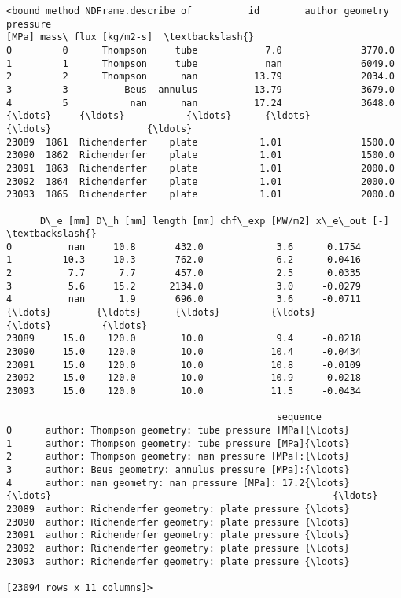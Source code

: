 \documentclass[11pt]{article}
\makeatletter
\newcommand{\boxspacing}{\kern\kvtcb@left@rule\kern\kvtcb@boxsep}
\newcommand{\prompt}[4]{
        {\ttfamily\llap{{\color{#2}[#3]:\hspace{3pt}#4}}\vspace{-\baselineskip}}
    }
\makeatother
\begin{document}
            \begin{tcolorbox}[breakable, size=fbox, boxrule=.5pt, pad at break*=1mm, opacityfill=0]
\prompt{Out}{outcolor}{2}{\boxspacing}
\begin{Verbatim}[commandchars=\\\{\}]
<bound method NDFrame.describe of          id        author geometry pressure
[MPa] mass\_flux [kg/m2-s]  \textbackslash{}
0         0      Thompson     tube            7.0              3770.0
1         1      Thompson     tube            nan              6049.0
2         2      Thompson      nan          13.79              2034.0
3         3          Beus  annulus          13.79              3679.0
4         5           nan      nan          17.24              3648.0
{\ldots}     {\ldots}           {\ldots}      {\ldots}            {\ldots}                 {\ldots}
23089  1861  Richenderfer    plate           1.01              1500.0
23090  1862  Richenderfer    plate           1.01              1500.0
23091  1863  Richenderfer    plate           1.01              2000.0
23092  1864  Richenderfer    plate           1.01              2000.0
23093  1865  Richenderfer    plate           1.01              2000.0

      D\_e [mm] D\_h [mm] length [mm] chf\_exp [MW/m2] x\_e\_out [-]  \textbackslash{}
0          nan     10.8       432.0             3.6      0.1754
1         10.3     10.3       762.0             6.2     -0.0416
2          7.7      7.7       457.0             2.5      0.0335
3          5.6     15.2      2134.0             3.0     -0.0279
4          nan      1.9       696.0             3.6     -0.0711
{\ldots}        {\ldots}      {\ldots}         {\ldots}             {\ldots}         {\ldots}
23089     15.0    120.0        10.0             9.4     -0.0218
23090     15.0    120.0        10.0            10.4     -0.0434
23091     15.0    120.0        10.0            10.8     -0.0109
23092     15.0    120.0        10.0            10.9     -0.0218
23093     15.0    120.0        10.0            11.5     -0.0434

                                                sequence
0      author: Thompson geometry: tube pressure [MPa]{\ldots}
1      author: Thompson geometry: tube pressure [MPa]{\ldots}
2      author: Thompson geometry: nan pressure [MPa]:{\ldots}
3      author: Beus geometry: annulus pressure [MPa]:{\ldots}
4      author: nan geometry: nan pressure [MPa]: 17.2{\ldots}
{\ldots}                                                  {\ldots}
23089  author: Richenderfer geometry: plate pressure {\ldots}
23090  author: Richenderfer geometry: plate pressure {\ldots}
23091  author: Richenderfer geometry: plate pressure {\ldots}
23092  author: Richenderfer geometry: plate pressure {\ldots}
23093  author: Richenderfer geometry: plate pressure {\ldots}

[23094 rows x 11 columns]>
\end{Verbatim}
\end{tcolorbox}
        
\end{document}

